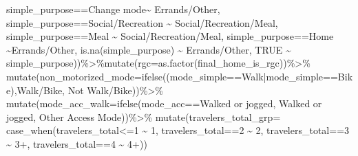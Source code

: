\documentclass[
  12pt,
]{article}
\newenvironment{Shaded}{\begin{snugshade}}{\end{snugshade}}
\newcommand{\AttributeTok}[1]{\textcolor[rgb]{0.77,0.63,0.00}{#1}}
\newcommand{\ConstantTok}[1]{\textcolor[rgb]{0.00,0.00,0.00}{#1}}
\newcommand{\DecValTok}[1]{\textcolor[rgb]{0.00,0.00,0.81}{#1}}
\newcommand{\FunctionTok}[1]{\textcolor[rgb]{0.00,0.00,0.00}{#1}}
\newcommand{\NormalTok}[1]{#1}
\newcommand{\SpecialCharTok}[1]{\textcolor[rgb]{0.00,0.00,0.00}{#1}}
\newcommand{\StringTok}[1]{\textcolor[rgb]{0.31,0.60,0.02}{#1}}
\begin{document}
\begin{Shaded}
\begin{Highlighting}[]
\NormalTok{                                  simple\_purpose}\SpecialCharTok{==}\StringTok{\textquotesingle{}Change mode\textquotesingle{}}\SpecialCharTok{\textasciitilde{}} \StringTok{\textquotesingle{}Errands/Other\textquotesingle{}}\NormalTok{,}
\NormalTok{                                  simple\_purpose}\SpecialCharTok{==}\StringTok{\textquotesingle{}Social/Recreation\textquotesingle{}} \SpecialCharTok{\textasciitilde{}} \StringTok{\textquotesingle{}Social/Recreation/Meal\textquotesingle{}}\NormalTok{,}
\NormalTok{                                  simple\_purpose}\SpecialCharTok{==}\StringTok{\textquotesingle{}Meal\textquotesingle{}} \SpecialCharTok{\textasciitilde{}} \StringTok{\textquotesingle{}Social/Recreation/Meal\textquotesingle{}}\NormalTok{,}
\NormalTok{                                  simple\_purpose}\SpecialCharTok{==}\StringTok{\textquotesingle{}Home\textquotesingle{}} \SpecialCharTok{\textasciitilde{}}\StringTok{\textquotesingle{}Errands/Other\textquotesingle{}}\NormalTok{,}
                                  \FunctionTok{is.na}\NormalTok{(simple\_purpose) }\SpecialCharTok{\textasciitilde{}} \StringTok{\textquotesingle{}Errands/Other\textquotesingle{}}\NormalTok{,}
                                  \ConstantTok{TRUE} \SpecialCharTok{\textasciitilde{}}\NormalTok{ simple\_purpose))}\SpecialCharTok{\%\textgreater{}\%}\FunctionTok{mutate}\NormalTok{(}\AttributeTok{rgc=}\FunctionTok{as.factor}\NormalTok{(final\_home\_is\_rgc))}\SpecialCharTok{\%\textgreater{}\%}
  \FunctionTok{mutate}\NormalTok{(}\AttributeTok{non\_motorized\_mode=}\FunctionTok{ifelse}\NormalTok{((mode\_simple}\SpecialCharTok{==}\StringTok{\textquotesingle{}Walk\textquotesingle{}}\SpecialCharTok{|}\NormalTok{mode\_simple}\SpecialCharTok{==}\StringTok{\textquotesingle{}Bike\textquotesingle{}}\NormalTok{),}\StringTok{\textquotesingle{}Walk/Bike\textquotesingle{}}\NormalTok{, }\StringTok{\textquotesingle{}Not Walk/Bike\textquotesingle{}}\NormalTok{))}\SpecialCharTok{\%\textgreater{}\%}
  \FunctionTok{mutate}\NormalTok{(}\AttributeTok{mode\_acc\_walk=}\FunctionTok{ifelse}\NormalTok{(mode\_acc}\SpecialCharTok{==}\StringTok{\textquotesingle{}Walked or jogged\textquotesingle{}}\NormalTok{, }\StringTok{\textquotesingle{}Walked or jogged\textquotesingle{}}\NormalTok{, }\StringTok{\textquotesingle{}Other Access Mode\textquotesingle{}}\NormalTok{))}\SpecialCharTok{\%\textgreater{}\%}
  \FunctionTok{mutate}\NormalTok{(}\AttributeTok{travelers\_total\_grp=} \FunctionTok{case\_when}\NormalTok{(travelers\_total}\SpecialCharTok{\textless{}=}\DecValTok{1} \SpecialCharTok{\textasciitilde{}} \StringTok{\textquotesingle{}1\textquotesingle{}}\NormalTok{,}
\NormalTok{                                        travelers\_total}\SpecialCharTok{==}\DecValTok{2} \SpecialCharTok{\textasciitilde{}} \StringTok{\textquotesingle{}2\textquotesingle{}}\NormalTok{,}
\NormalTok{                                        travelers\_total}\SpecialCharTok{==}\DecValTok{3} \SpecialCharTok{\textasciitilde{}} \StringTok{\textquotesingle{}3+\textquotesingle{}}\NormalTok{,}
\NormalTok{                                        travelers\_total}\SpecialCharTok{==}\DecValTok{4} \SpecialCharTok{\textasciitilde{}} \StringTok{\textquotesingle{}4+\textquotesingle{}}\NormalTok{))}



\end{Highlighting}
\end{Shaded}
\end{document}
